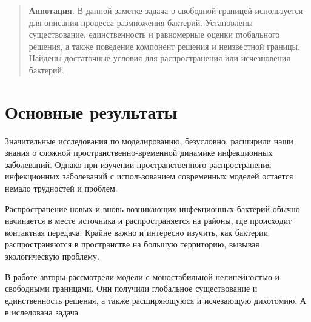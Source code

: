 
\maketitle

\begin{abstract}
\textbf{Аннотация.} В данной заметке задача о свободной границей используется для описания процесса размножения бактерий. Установлены существование, единственность и равномерные оценки глобального решения, а также поведение компонент решения и неизвестной границы. Найдены достаточные условия для распространения или исчезновения бактерий.

\end{abstract}

\section{Основные результаты} %

Значительные исследования по моделированию, безусловно, расширили наши знания о сложной пространственно-временной динамике инфекционных заболеваний. Однако при изучении пространственного распространения инфекционных заболеваний с использованием современных моделей остается немало трудностей и проблем.

Распространение новых и вновь возникающих инфекционных бактерий обычно начинается в месте источника и распространяется на районы, где происходит контактная передача. Крайне важно и интересно изучить, как бактерии распространяются в пространстве на большую территорию, вызывая экологическую проблему.

В работе \cite{Ahn} авторы рассмотрели модели с моностабильной нелинейностью и свободными границами. Они получили глобальное существование и единственность решения, а также расширяющуюся и исчезающую дихотомию. А в \cite{Zhao} иследована задача

